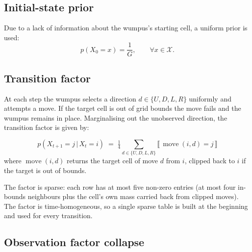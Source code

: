 \documentclass[11pt, a4paper]{article}
\newcommand{\given}{\,\vert\,}
\newcommand{\states}{\mathcal{X}}
\DeclareMathOperator{\Move}{move}
\begin{document}
\subsection{Initial-state prior}

Due to a lack of information about the wumpus's starting cell, a uniform
prior is used:
\begin{equation}
p(X_0 = x) = \frac{1}{G}, \qquad \forall x \in \states.
\label{eq:prior}
\end{equation}

\subsection{Transition factor}

At each step the wumpus selects a direction $d \in \{U, D, L, R\}$
uniformly and attempts a move. If the target cell is out of grid bounds the
move fails and the wumpus remains in place. Marginalising out the unobserved
direction, the transition factor is given by:

\[
p(X_{t+1} = j \given X_t = i)
\;=\;
\tfrac{1}{4} \sum_{d \in \{U, D, L, R\}}
\llbracket \,\Move(i, d) = j\,\rrbracket
\]
where $\Move(i, d)$ returns the target cell of move $d$ from $i$, clipped
back to $i$ if the target is out of bounds.
\label{eq:transition}


\noindent The factor is sparse: each row has at most five non-zero entries
(at most four in-bounds neighbours plus the cell's own mass carried back from clipped moves).
The factor is time-homogeneous, so a single
sparse table is built at the beginning and used for every transition.

\subsection{Observation factor collapse}
\label{sec:obs}
\end{document}
